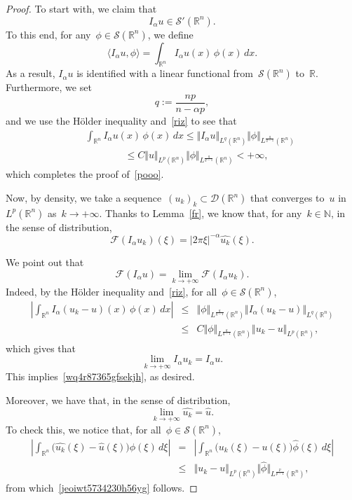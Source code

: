 \documentclass[11pt,hyp,]{nyjm}
\numberwithin{equation}{section}
\newcommand{\R}{\mathbb{R}}
\newcommand{\N}{\mathbb{N}}
\theoremstyle{remark}
\newcommand{\Int}{\int_{\mathbb{R}^n}}
\renewcommand{\leq}{\leqslant}
\renewcommand{\le}{\leqslant}
\begin{document}
\begin{proof}
To start with, we claim that 
\begin{equation}\label{pooo}
I_{\alpha}u \in \mathcal{S}'(\R^n).
\end{equation}
To this end, for any~$\phi\in{\mathcal{S}}(\R^n)$, we define
$$\langle I_{\alpha}u, \phi\rangle= \Int I_{\alpha}u (x)\, \phi(x) \, dx.$$
As a result, $I_{\alpha}u$ is identified with a linear functional from~${\mathcal{S}}(\R^n)$ to~$\R$. Furthermore,
we set	
\[q:= \frac{np}{n-\alpha p}, \]
and we use the H\"older inequality and~\eqref{riz} to see that
				\begin{eqnarray*}&&\Int I_{\alpha}u(x) \, \phi(x) \, dx \leq \Vert I_{\alpha}u \Vert_{L^q(\R^n)} \Vert \phi \Vert_{L^{\frac{q}{q-1}}(\R^n)} \\&&\qquad\qquad\leq C \Vert u \Vert_{L^p(\R^n)}\Vert \phi \Vert_{L^{\frac{q}{q-1}}(\R^n)} < +\infty,\end{eqnarray*}
				which completes the proof of~\eqref{pooo}.

Now, by density, we take a sequence~$(u_k)_k \subset \mathcal{D}(\R^n)$ that converges to~$u$ in~$L^p(\R^n)$ as~$k\to+\infty$. Thanks to Lemma~\ref{fr}, we know that, for any~$k\in\N$, in the sense of distribution,
				\begin{equation}\label{klim}
		\mathcal{F}(I_{\alpha} u_k) (\xi) = | 2 \pi \xi|^{-\alpha} \widehat{u_k} (\xi).
				\end{equation}
				
We point out that
\begin{equation}\label{wq4r87365gfsekjh}
\mathcal{F}(I_{\alpha} u)= \lim_{k \to +\infty} \mathcal{F}(I_{\alpha} u_k).
\end{equation}
Indeed, by the H\"older inequality and~\eqref{riz}, for all~$\phi\in{\mathcal{S}}(\R^n)$,
\begin{eqnarray*}
\left|\Int I_{\alpha}(u_k-u) (x)\, \phi(x) \, dx \right|& \leq& \Vert \phi \Vert_{L^{\frac{q}{q-1}}(\R^n)} \Vert I_{\alpha}(u_k-u) \Vert_{L^q(\R^n)} \\&\leq& C \Vert \phi \Vert_{L^{\frac{q}{q-1}}(\R^n)} \Vert u_k-u\Vert_{L^p(\R^n)}
,\end{eqnarray*}
which gives that
$$ \lim_{k\to+\infty} I_{\alpha}u_k= I_{\alpha}u.$$
This implies~\eqref{wq4r87365gfsekjh}, as desired.

Moreover, we have that, in the sense of distribution,
\begin{equation}\label{jeoiwt5734230h56yg}
\lim_{k\to+\infty} \widehat{u_k} = \widehat{u}.\end{equation}
To check this, we notice that, for all~$\phi\in{\mathcal{S}}(\R^n)$,
\begin{eqnarray*}
\left|\int_{\R^n} \Big(\widehat{u_k}(\xi) -\widehat{u}(\xi)\Big)\phi(\xi)\,d\xi\right|
&=&\left| \int_{\R^n} \Big( {u_k}(\xi) - {u}(\xi)\Big)\widehat\phi(\xi)\,d\xi\right|\\&\le&
\Vert {u_k} - {u} \Vert_{L^p(\R^n)} \Vert\widehat\phi \Vert_{L^{\frac{p}{p-1}}(\R^n)} ,
\end{eqnarray*}
from which~\eqref{jeoiwt5734230h56yg} follows.


\end{proof}
\end{document}
